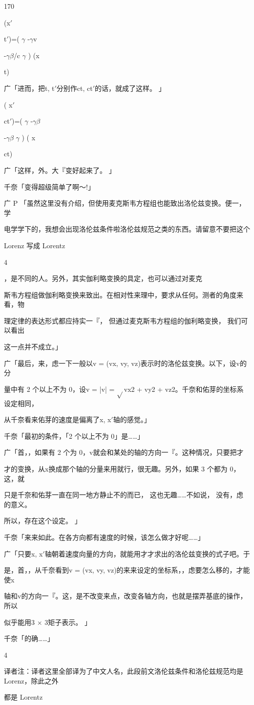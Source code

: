 170\par
(x$\prime$\par
t$\prime$)=( $\gamma$ -$\gamma$v\par
-$\gamma$$\beta$/c $\gamma$ ) (x\par
t)\par
广「进而，把t, t$\prime$分别作ct, ct$\prime$的话，就成了这样。 」\par
( x$\prime$\par
ct$\prime$)=( $\gamma$ -$\gamma$$\beta$\par
-$\gamma$$\beta$ $\gamma$ ) ( x\par
ct)\par
广「这样，外。大『变好起来了。 」\par
千奈「变得超级简单了啊～!」\par
广 P 「虽然这里没有介绍，但使用麦克斯韦方程组也能致出洛伦兹变换。便一，学\par
电学学下的，我想会出现洛伦兹条件啦洛伦兹规范之类的东西。请留意不要把这个\par
Lorenz 写成 Lorentz\par
4\par
，是不同的人。另外，其实伽利略变换的具定，也可以通过对麦克\par
斯韦方程组做伽利略变换来致出。在相对性来理中，要求从任何。测者的角度来看，物\par
理定律的表达形式都应持实一『， 但通过麦克斯韦方程组的伽利略变换， 我们可以看出\par
这一点并不成立。」\par
广「最后，来，虑一下一般以v = (vx, vy, vz)表示时的洛伦兹变换。以下，设v的分\par
量中有 2 个以上不为 0，设v = |v| = $\sqrt{}$vx2 + vy2 + vz2。千奈和佑芽的坐标系设定相同，\par
从千奈看来佑芽的速度是偏离了x, x$\prime$轴的感觉。」\par
千奈「最初的条件，「2 个以上不为 0」是……」\par
广「首，，如果有 2 个为 0，v就会和某处的轴的方向一『。这种情况，只要把才\par
才的变换，从x换成那个轴的分量来用就行，很无趣。另外，如果 3 个都为 0，这，就\par
只是千奈和佑芽一直在同一地方静止不的而已， 这也无趣……不如说， 没有，虑的意义。\par
所以，存在这个设定。 」\par
千奈「来来如此。在各方向都有速度的时候，该怎么做才好呢……」\par
广「只要x, x$\prime$轴朝着速度向量的方向，就能用才才求出的洛伦兹变换的式子吧。于\par
是，首，，从千奈看到v = (vx, vy, vz)的来来设定的坐标系，，虑要怎么移的，才能使x\par
轴和v的方向一『。这，是不改变来点，改变各轴方向，也就是摆弄基底的操作，所以\par
似乎能用3 $\times$ 3矩子表示。 」\par
千奈「的确……」\par
4\par
译者注：译者这里全部译为了中文人名，此段前文洛伦兹条件和洛伦兹规范均是 Lorenz，除此之外\par
都是 Lorentz\par

